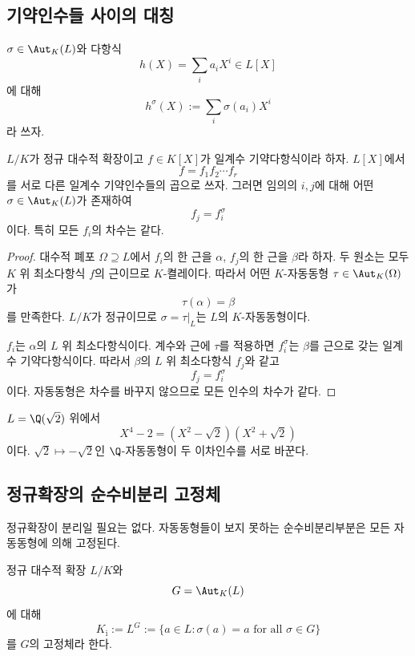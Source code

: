 \subsection{기약인수들 사이의 대칭}

$\sigma\in\Aut_K(L)$와 다항식
\[
  h(X)=\sum_i a_iX^i\in L[X]
\]
에 대해
\[
  h^\sigma(X):=\sum_i\sigma(a_i)X^i
\]
라 쓰자.

\begin{theorem}
$L/K$가 정규 대수적 확장이고 $f\in K[X]$가 일계수 기약다항식이라 하자. $L[X]$에서
\[
  f=f_1f_2\cdots f_r
\]
를 서로 다른 일계수 기약인수들의 곱으로 쓰자. 그러면 임의의 $i,j$에 대해 어떤 $\sigma\in\Aut_K(L)$가 존재하여
\[
  f_j=f_i^\sigma
\]
이다. 특히 모든 $f_i$의 차수는 같다.
\end{theorem}

\begin{proof}
대수적 폐포 $\Omega\supseteq L$에서 $f_i$의 한 근을 $\alpha$, $f_j$의 한 근을 $\beta$라 하자. 두 원소는 모두 $K$ 위 최소다항식 $f$의 근이므로 $K$-켤레이다. 따라서 어떤 $K$-자동동형 $\tau\in\Aut_K(\Omega)$가
\[
  \tau(\alpha)=\beta
\]
를 만족한다. $L/K$가 정규이므로 $\sigma=\tau|_L$는 $L$의 $K$-자동동형이다.

$f_i$는 $\alpha$의 $L$ 위 최소다항식이다. 계수와 근에 $\tau$를 적용하면 $f_i^\sigma$는 $\beta$를 근으로 갖는 일계수 기약다항식이다. 따라서 $\beta$의 $L$ 위 최소다항식 $f_j$와 같고
\[
  f_j=f_i^\sigma
\]
이다. 자동동형은 차수를 바꾸지 않으므로 모든 인수의 차수가 같다.
\end{proof}

\begin{example}
$L=\Q(\sqrt2)$ 위에서
\[
  X^4-2=(X^2-\sqrt2)(X^2+\sqrt2)
\]
이다. $\sqrt2\mapsto-\sqrt2$인 $\Q$-자동동형이 두 이차인수를 서로 바꾼다.
\end{example}

\subsection{정규확장의 순수비분리 고정체}

정규확장이 분리일 필요는 없다. 자동동형들이 보지 못하는 순수비분리부분은 모든 자동동형에 의해 고정된다.

\begin{definition}
정규 대수적 확장 $L/K$와
\[
  G=\Aut_K(L)
\]
에 대해
\[
  K_{\mathrm i}:=L^G
  :=\{a\in L:\sigma(a)=a\text{ for all }\sigma\in G\}
\]
를 $G$의 고정체라 한다.
\end{definition}

